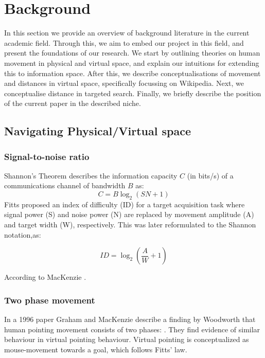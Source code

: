 \section{Background}
\label{sec:background}
In this section we provide an overview of background literature in the current academic field. Through this, we aim to embed our project in this field, and present the foundations of our research. We start by outlining theories on human movement in physical and virtual space, and explain our intuitions for extending this to information space. After this, we describe conceptualisations of movement and distances in virtual space, specifically focussing on Wikipedia. Next, we conceptualise distance in targeted search. Finally, we briefly describe the position of the current paper in the described niche. 

\subsection{Navigating Physical/Virtual space}
\subsubsection{Signal-to-noise ratio}
Shannon's Theorem describes the information capacity $C$ (in bits/s) of a communications channel of bandwidth $B$ as: \[C=B\log_2(SN+1)\] Fitts proposed an index of difficulty (ID) for a target acquisition task where signal power (S) and noise power (N) are replaced by movement amplitude (A) and target width (W), respectively. This was later reformulated to the Shannon notation,as:

\[ID=\log_2(\frac{A}{W}+1)\]

According to MacKenzie .

\subsubsection{Two phase movement}
In a 1996 paper Graham and MacKenzie\cite{physicalvirtualpointing} describe a finding by Woodworth\cite{pointing} that human pointing movement consists of two phases: . They find evidence of similar behaviour in virtual pointing behaviour. Virtual pointing is conceptualized as mouse-movement towards a goal, which follows Fitts' law. 

